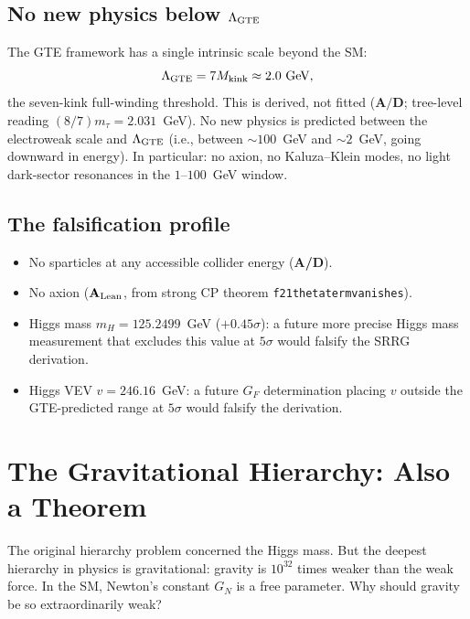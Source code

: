 \documentclass[11pt,a4paper]{article}
\newcommand{\lean}[1]{%
  \penalty-100
  \begingroup\def\_{\textunderscore\allowbreak}\texttt{#1}\endgroup}
\newcommand{\CatAL}{\ensuremath{\mathbf{A}_{\rm Lean}}}
\newcommand{\CatAD}{\textbf{A/D}}
\begin{document}
\subsection{No new physics below $\Lambda_{\rm GTE}$}

The GTE framework has a single intrinsic scale beyond the SM:
\[
  \Lambda_{\rm GTE} = 7 M_{\rm kink} \approx 2.0~\text{GeV},
\]
the seven-kink full-winding threshold.
This is derived, not fitted ($\CatAD$; tree-level reading
$(8/7)m_\tau = 2.031$~GeV).
No new physics is predicted between the electroweak scale and $\Lambda_{\rm GTE}$
(i.e., between $\sim 100$~GeV and $\sim 2$~GeV, going downward in energy).
In particular: no axion, no Kaluza--Klein modes, no light dark-sector
resonances in the $1$--$100$~GeV window.

\subsection{The falsification profile}

\begin{tcolorbox}[colback=boxblue,colframe=blue!40!black,
  title={Falsifiable predictions from the SRRG hierarchy solution}]
\begin{itemize}[itemsep=2pt]
  \item No sparticles at any accessible collider energy (\CatAD).
  \item No axion (\CatAL, from strong CP theorem
    \lean{f21\_theta\_term\_vanishes}).
  \item Higgs mass $m_H = 125.2499$~GeV ($+0.45\sigma$):
    a future more precise Higgs mass measurement that excludes this value
    at $5\sigma$ would falsify the SRRG derivation.
  \item Higgs VEV $v = 246.16$~GeV:
    a future $G_F$ determination placing $v$ outside the GTE-predicted
    range at $5\sigma$ would falsify the derivation.
\end{itemize}
\end{tcolorbox}

\section{The Gravitational Hierarchy: Also a Theorem}
\label{sec:gravity}

The original hierarchy problem concerned the Higgs mass.
But the deepest hierarchy in physics is gravitational: gravity is
$10^{32}$ times weaker than the weak force.
In the SM, Newton's constant $G_N$ is a free parameter.
Why should gravity be so extraordinarily weak?
\end{document}
